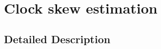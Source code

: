 \hypertarget{group__chaos-test-skew}{\section{Clock skew estimation}
\label{group__chaos-test-skew}
}


\subsection{Detailed Description}
